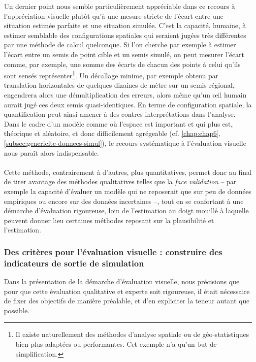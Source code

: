 Un dernier point nous semble particulièrement appréciable dans ce recours à l'appréciation visuelle plutôt qu'à une mesure stricte de l'écart entre une situation estimée parfaite et une situation simulée.
C'est la capacité, humaine, à estimer semblable des configurations spatiales qui seraient jugées très différentes par une méthode de calcul quelconque.
Si l'on cherche par exemple à estimer l'écart entre un semis de point cible et un semis simulé, on peut mesurer l'écart comme, par exemple, une somme des écarts de chacun des points à celui qu'ils sont sensés représenter\footnote{
	Il existe naturellement des méthodes d'analyse spatiale ou de géo-statistiques bien plus adaptées ou performantes.
	Cet exemple n'a qu'un but de simplification.
}.
Un décallage minime, par exemple obtenu par translation horizontales de quelques dizaines de mètre sur un semis régional, engendrera alors une démultiplication des erreurs, alors même qu'un œil humain aurait jugé ces deux semis quasi-identiques.
En terme de configuration spatiale, la quantification peut ainsi amener à des contres interprétations dans l'analyse.
Dans le cadre d'un modèle comme \simfeodal{} où l'espace est important et qui plus est, théorique et aléatoire, et donc difficilement agrégeable (cf. \cref{chap:chap6}, \cref{subsec:genericite-donnees-simul}), le recours systématique à l'évaluation visuelle nous paraît alors indispensable.

\paragraph*{}Cette méthode, contrairement à d'autres, plus quantitatives, permet donc au final de tirer avantage des méthodes qualitatives telles que la \textit{face validation} -- par exemple la capacité d'évaluer un modèle qui ne reposerait que sur peu de données empiriques ou encore sur des données incertaines --, tout en se confortant à une démarche d'évaluation rigoureuse, loin de l'estimation \og au doigt mouillé\fg{} à laquelle peuvent donner lieu certaines méthodes reposant sur la plausibilité et l'estimation.

\subsubsection{Des critères pour l'évaluation visuelle : construire des indicateurs de sortie de simulation}

Dans la présentation de la démarche d'évaluation visuelle, nous précisions que pour que cette évaluation qualitative et experte soit rigoureuse, il était nécessaire de fixer des objectifs de manière préalable, et d'en expliciter la teneur autant que possible.

